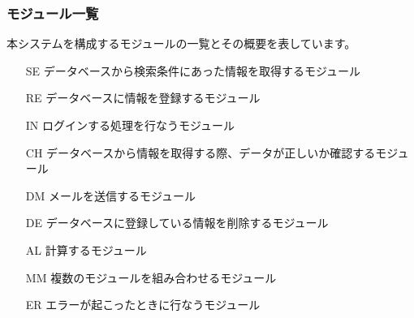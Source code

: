 \documentclass[a4j,titlepage]{jarticle}
\begin{document}
\subsubsection{モジュール一覧}
本システムを構成するモジュールの一覧とその概要を表しています。
\begin{enumerate}
\item [SE] データベースから検索条件にあった情報を取得するモジュール
\item [RE] データベースに情報を登録するモジュール
\item [IN] ログインする処理を行なうモジュール
\item [CH] データベースから情報を取得する際、データが正しいか確認するモジュール
\item [DM] メールを送信するモジュール
\item [DE] データベースに登録している情報を削除するモジュール
\item [AL] 計算するモジュール
\item [MM] 複数のモジュールを組み合わせるモジュール
\item [ER] エラーが起こったときに行なうモジュール
\end{enumerate}
\end{document}
